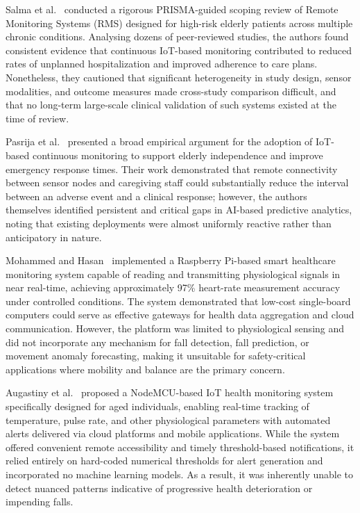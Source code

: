 \documentclass[conference]{IEEEtran}
\begin{document}
Salma et al.~\cite{salma2025} conducted a rigorous PRISMA-guided scoping
review of Remote Monitoring Systems (RMS) designed for high-risk elderly
patients across multiple chronic conditions. Analysing dozens of peer-reviewed
studies, the authors found consistent evidence that continuous IoT-based
monitoring contributed to reduced rates of unplanned hospitalization and
improved adherence to care plans. Nonetheless, they cautioned that
significant heterogeneity in study design, sensor modalities, and outcome
measures made cross-study comparison difficult, and that no long-term
large-scale clinical validation of such systems existed at the time of
review.

Pasrija et al.~\cite{pasrija2025} presented a broad empirical argument for
the adoption of IoT-based continuous monitoring to support elderly
independence and improve emergency response times. Their work demonstrated
that remote connectivity between sensor nodes and caregiving staff could
substantially reduce the interval between an adverse event and a clinical
response; however, the authors themselves identified persistent and critical
gaps in AI-based predictive analytics, noting that existing deployments
were almost uniformly reactive rather than anticipatory in nature.

Mohammed and Hasan~\cite{mohammed2022} implemented a Raspberry Pi-based
smart healthcare monitoring system capable of reading and transmitting
physiological signals in near real-time, achieving approximately 97\%
heart-rate measurement accuracy under controlled conditions. The system
demonstrated that low-cost single-board computers could serve as
effective gateways for health data aggregation and cloud communication.
However, the platform was limited to physiological sensing and did not
incorporate any mechanism for fall detection, fall prediction, or movement
anomaly forecasting, making it unsuitable for safety-critical applications
where mobility and balance are the primary concern.

Augastiny et al.~\cite{augastiny2023} proposed a NodeMCU-based IoT health
monitoring system specifically designed for aged individuals, enabling
real-time tracking of temperature, pulse rate, and other physiological
parameters with automated alerts delivered via cloud platforms and mobile
applications. While the system offered convenient remote accessibility and
timely threshold-based notifications, it relied entirely on hard-coded
numerical thresholds for alert generation and incorporated no machine
learning models. As a result, it was inherently unable to detect nuanced
patterns indicative of progressive health deterioration or impending falls.
\end{document}
